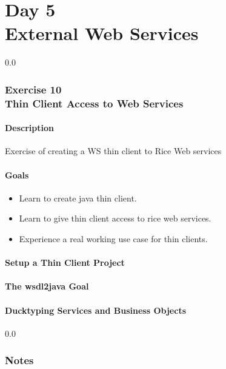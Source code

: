 \part*{Day 5\\ External Web Services}

{\setlength{\baselineskip}%
  {0.0\baselineskip}
  \section*{\flushright Exercise 10\\
Thin Client Access to Web Services}
  \hrulefill \par}

\subsection*{Description}
Exercise of creating a WS thin client to Rice Web services

\subsection*{Goals}
\begin{itemize}
    \item Learn to create java thin client.
    \item Learn to give thin client access to rice web services.
    \item Experience a real working use case for thin clients.
\end{itemize}

\subsection*{Setup a Thin Client Project}

\subsection*{The wsdl2java Goal}

\subsection*{Ducktyping Services and Business Objects}


\newpage
  {\setlength{\baselineskip}%
           {0.0\baselineskip}
  \section*{Notes}
  \hrulefill \par}
